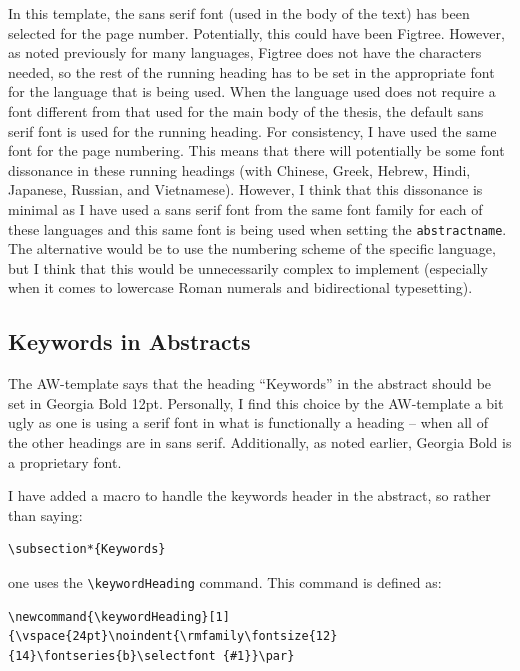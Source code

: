 \documentclass[12pt, twoside]{article}
\begin{document}
In this template, the sans serif font (used in the body of the text) has been selected for the page number. Potentially, this could have been Figtree. However, as noted previously for many languages, Figtree does not have the characters needed, so the rest of the running heading has to be set in the appropriate font for the language that is being used. When the language used does not require a font different from that used for the main body of the thesis, the default sans serif font is used for the running heading. For consistency, I have used the same font for the page numbering. This means that there will potentially be some font dissonance in these running headings (\eg with Chinese, Greek, Hebrew, Hindi, Japanese, Russian, and Vietnamese). However, I think that this dissonance is minimal as \first I have used a sans serif font from the same font family for each of these languages and \Second this same font is being used when setting the \texttt{abstractname}. The alternative would be to use the numbering scheme of the specific language, but I think that this would be unnecessarily complex to implement (especially when it comes to lowercase Roman numerals and bidirectional typesetting).

\subsection{Keywords in Abstracts}
\label{sec:cycle3KeywordsInAbstracts}
The AW-template says that the heading \enquote{Keywords} in the abstract should be set in Georgia Bold 12pt. Personally, I find this choice by the AW-template a bit ugly as one is using a serif font in what is functionally a heading -- when all of the other headings are in sans serif. Additionally, as noted earlier, Georgia Bold is a proprietary font.

I have added a macro to handle the keywords header in the abstract, so rather than saying:
\begin{lstlisting}[style=latexExampleForAuthors]
\subsection*{Keywords}
\end{lstlisting}
one uses the \texttt{\textbackslash keywordHeading} command. This command is defined as:
\begin{lstlisting}[style=latexExampleForAuthors]
\newcommand{\keywordHeading}[1]{\vspace{24pt}\noindent{\rmfamily\fontsize{12}{14}\fontseries{b}\selectfont {#1}}\par}
\end{lstlisting}
\end{document}
